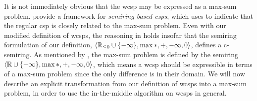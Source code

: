 It is not immediately obvious that the \gls{wcsp} may be expressed as a max-sum problem.
\Textcite{Bistarelli97} provide a framework for \emph{semiring-based \glspl{csp}}, which \textcite{Werner07} uses to indicate that the regular \gls{csp} is closely related to the max-sum problem.
Even with our modified definition of \glspl{wcsp}, the reasoning in \textcite[\pno~230]{Bistarelli97} holds insofar that the semiring formulation of our definition, \(\langle \mathbb{R}_{\leq0}\cup\{-\infty\}, \max*, +, -\infty, 0 \rangle\), defines a c-semiring.
As mentioned by \textcite[\pno~3]{Werner07}, the max-sum problem is defined by the semiring \(\langle \mathbb{R}\cup\{-\infty\}, \max*, +, -\infty, 0 \rangle\), which means a \gls{wcsp} should be expressible in terms of a max-sum problem since the only difference is in their domain.
We will now describe an explicit transformation from our definition of \glspl{wcsp} into a max-sum problem, in order to use the in-the-middle algorithm on \glspl{wcsp} in general.

